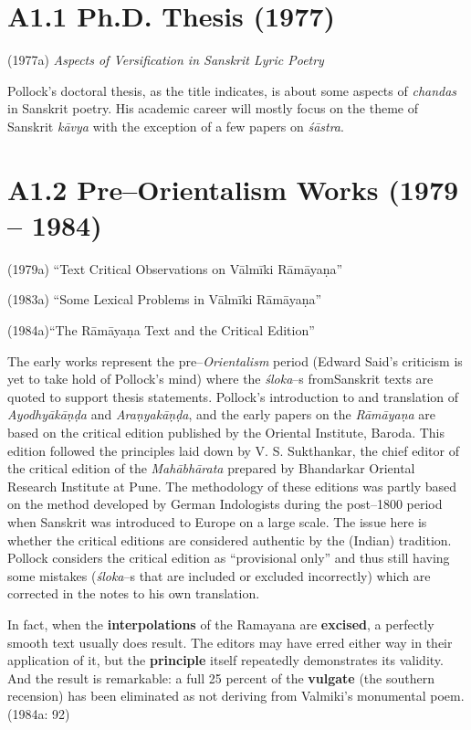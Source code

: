 \section*{A1.1 Ph.D. Thesis (1977)}

(1977a)\textit{ Aspects of Versification in Sanskrit Lyric Poetry}

Pollock’s doctoral thesis, as the title indicates, is about some aspects of \textit{chandas} in Sanskrit poetry. His academic career will mostly focus on the theme of Sanskrit \textit{kāvya} with the exception of a few papers on \textit{śāstra}.


\section*{A1.2 Pre–Orientalism Works (1979 – 1984)}

\item (1979a) “Text Critical Observations on Vālmīki Rāmāyaṇa”
 
 \item (1983a) “Some Lexical Problems in Vālmīki Rāmāyaṇa”
 
 \item (1984a)“The Rāmāyaṇa Text and the Critical Edition”

The early works represent the pre–\textit{Orientalism} period (Edward Said’s criticism is yet to take hold of Pollock’s mind) where the \textit{śloka}–s fromSanskrit texts are quoted to support thesis statements. Pollock’s introduction to and translation of \textit{Ayodhyākāṇḍa} and \textit{Araṇyakāṇḍa}, and the early papers on the \textit{Rāmāyaṇa} are based on the critical edition published by the Oriental Institute, Baroda. This edition followed the principles laid down by V. S. Sukthankar, the chief editor of the critical edition of the \textit{Mahābhārata} prepared by Bhandarkar Oriental Research Institute at Pune. The methodology of these editions was partly based on the method developed by German Indologists during the post–1800 period when Sanskrit was introduced to Europe on a large scale. The issue here is whether the critical editions are considered authentic by the (Indian) tradition. Pollock considers the critical edition as “provisional only” and thus still having some mistakes (\textit{śloka}–s that are included or excluded incorrectly) which are corrected in the notes to his own translation.

\begin{myquote}
In fact, when the \textbf{interpolations} of the Ramayana are \textbf{excised}, a perfectly smooth text usually does result. The editors may have erred either way in their application of it, but the \textbf{principle} itself repeatedly demonstrates its validity. And the result is remarkable: a full 25 percent of the \textbf{vulgate} (the southern recension) has been eliminated as not deriving from Valmiki’s monumental poem. (1984a: 92)
\end{myquote}

